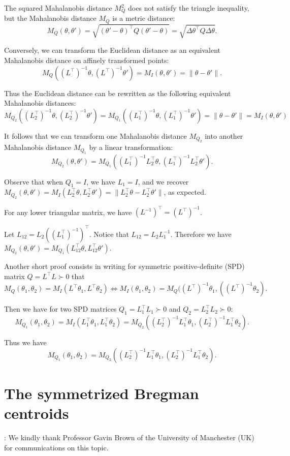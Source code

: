 \documentclass[11pt]{article}
\begin{document}
The squared Mahalanobis distance $M_Q^2$ does not satisfy the triangle inequality, but the  Mahalanobis distance $M_Q$ is a metric distance:
$$
M_Q(\theta,\theta') = \sqrt{(\theta'-\theta)^\top Q (\theta'-\theta)}=\sqrt{\Delta\theta^\top Q \Delta\theta}.
$$


Conversely, we can transform the Euclidean distance as an equivalent Mahalanobis distance on affinely transformed points:
$$
M_Q( (L^\top)^{-1}\theta, (L^\top)^{-1}\theta') = M_I(\theta,\theta') = \|\theta-\theta'\|.
$$

Thus  the Euclidean distance can be rewritten as the following equivalent Mahalanobis distances:
$$
M_{Q_2}( (L_2^\top)^{-1}\theta, (L_2^\top)^{-1}\theta') = M_{Q_1}( (L_1^\top)^{-1}\theta,(L_1^\top)^{-1}\theta')= \|\theta-\theta'\|
=M_I(\theta,\theta')
$$

It follows that we can transform one Mahalanobis distance $M_{Q_2}$ into another  Mahalanobis distance $M_{Q_1}$ by a linear transformation:
$$
M_{Q_2}(\theta,\theta') = 
M_{Q_1}( (L_1^\top)^{-1}L_2^\top \theta, (L_1^\top)^{-1}L_2^\top \theta').
$$

Observe that when $Q_1=I$, we have $L_1=I$, and we recover $M_{Q_2}(\theta,\theta')=M_I(L_2^\top \theta,L_2^\top \theta')=\|L_2^\top \theta - L_2^\top \theta'\|$, as expected.

For any lower triangular matrix, we have $(L^{-1})^\top=(L^\top)^{-1}$.


Let $L_{12}=L_2 \left(\left(L_1^\top\right)^{-1}\right)^\top$.
Notice that $L_{12}=L_2L_1^{-1}$.
Therefore we have $M_{Q_2}(\theta,\theta') =  M_{Q_1}(L_{12}^\top \theta, L_{12}^\top \theta' ) $.


Another short proof consists in writing for symmetric positive-definite (SPD) matrix $Q=L^\top L\succ 0$ that
$$
M_Q(\theta_1,\theta_2)= M_I(L^\top\theta_1,L^\top\theta_2)  \Leftrightarrow
M_I(\theta_1,\theta_2) = M_Q((L^\top)^{-1}\theta_1,((L^\top)^{-1}\theta_2).
$$


Then we have for two SPD matrices $Q_1=L_1^\top L_1\succ 0$ and $Q_2=L_2^\top L_2\succ 0$:
$$
M_{Q_1}(\theta_1,\theta_2)=
M_I(L_1^\top\theta_1,L_1^\top\theta_2)= 
M_{Q_2}((L_2^\top)^{-1}L_1^\top\theta_1,(L_2^\top)^{-1}L_1^\top\theta_2).
$$

Thus we have
$$
M_{Q_1}(\theta_1,\theta_2)=M_{Q_2}((L_2^\top)^{-1}L_1^\top\theta_1,(L_2^\top)^{-1}L_1^\top\theta_2).
$$


\section{The symmetrized Bregman centroids}

: We kindly thank Professor Gavin Brown
of the University of Manchester (UK) for communications on this topic.




\end{document}
